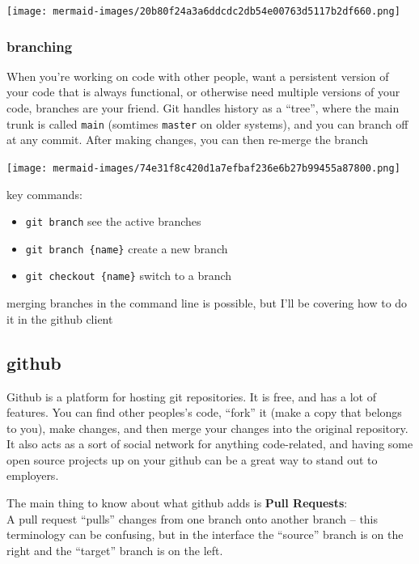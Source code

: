 \documentclass[
]{article}
\providecommand{\tightlist}{%
  \setlength{\itemsep}{0pt}\setlength{\parskip}{0pt}}
\begin{document}
\texttt{[image: mermaid-images/20b80f24a3a6ddcdc2db54e00763d5117b2df660.png]}

\hypertarget{branching}{%
\subsubsection{branching}\label{branching}}

When you're working on code with other people, want a persistent version
of your code that is always functional, or otherwise need multiple
versions of your code, branches are your friend. Git handles history as
a ``tree'', where the main trunk is called \texttt{main} (somtimes
\texttt{master} on older systems), and you can branch off at any commit.
After making changes, you can then re-merge the branch

\texttt{[image: mermaid-images/74e31f8c420d1a7efbaf236e6b27b99455a87800.png]}

key commands:

\begin{itemize}
\tightlist
\item
  \texttt{git\ branch} see the active branches
\item
  \texttt{git\ branch\ \{name\}} create a new branch
\item
  \texttt{git\ checkout\ \{name\}} switch to a branch
\end{itemize}

merging branches in the command line is possible, but I'll be covering
how to do it in the github client

\hypertarget{github}{%
\subsection{github}\label{github}}

Github is a platform for hosting git repositories. It is free, and has a
lot of features. You can find other peoples's code, ``fork'' it (make a
copy that belongs to you), make changes, and then merge your changes
into the original repository. It also acts as a sort of social network
for anything code-related, and having some open source projects up on
your github can be a great way to stand out to employers.

The main thing to know about what github adds is \textbf{Pull
Requests}:\\
A pull request ``pulls'' changes from one branch onto another branch --
this terminology can be confusing, but in the interface the ``source''
branch is on the right and the ``target'' branch is on the left.
\end{document}
